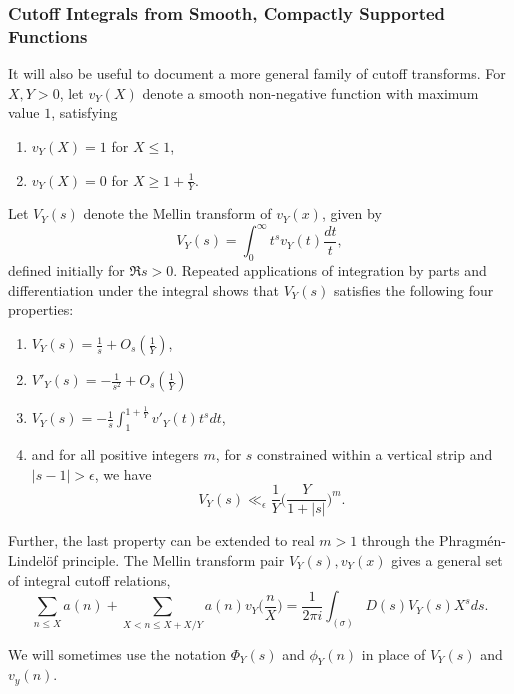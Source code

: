 \subsubsection*{Cutoff Integrals from Smooth, Compactly Supported Functions}


It will also be useful to document a more general family of cutoff transforms.
For $X,Y > 0$, let $v_Y(X)$ denote a smooth non-negative function with maximum value $1$,
satisfying
\begin{enumerate}
  \item $v_Y(X) = 1$ for $X \leq 1$,
  \item $v_Y(X) = 0$ for $X \geq 1 + \frac{1}{Y}$.
\end{enumerate}
Let $V_Y(s)$ denote the Mellin transform of $v_Y(x)$, given by
\begin{equation}
  V_Y(s) = \int_0^\infty t^s v_Y(t) \frac{dt}{t},
\end{equation}
defined initially for $\Re s > 0$.
Repeated applications of integration by parts and differentiation under the integral shows
that $V_Y(s)$ satisfies the following four properties:
\begin{enumerate}
  \item $V_Y(s) = \frac{1}{s} + O_s(\frac{1}{Y})$,
  \item $V'_Y(s) = -\frac{1}{s^2} + O_s(\frac{1}{Y})$
  \item $V_Y(s) = -\frac{1}{s} \int_1^{1 + \frac{1}{Y}} v'_Y(t) t^s dt$,
  \item and for all positive integers $m$, for $s$ constrained within a vertical strip and
    $\lvert s-1 \rvert > \epsilon$, we have
    \begin{equation}
      V_Y(s) \ll_\epsilon \frac{1}{Y} \Big( \frac{Y}{1 + \lvert s \rvert} \Big)^m.
    \end{equation}
\end{enumerate}
Further, the last property can be extended to real $m > 1$ through the
Phragm\'{e}n-Lindel\"{o}f principle.
The Mellin transform pair $V_Y(s), v_Y(x)$ gives a general set of integral cutoff
relations,
\begin{equation}
  \sum_{n \leq X} a(n) + \sum_{X < n \leq X + X/Y} a(n) v_Y\Big(\frac{n}{X}\Big) =
  \frac{1}{2\pi i} \int_{(\sigma)} D(s) V_Y(s) X^s ds.
\end{equation}

\begin{remark}
  We will sometimes use the notation $\Phi_Y(s)$ and $\phi_Y(n)$
  in place of $V_Y(s)$ and $v_y(n)$.
\end{remark}

